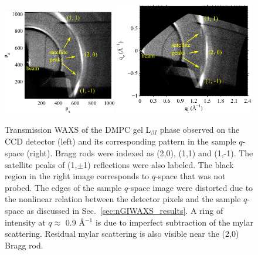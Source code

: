 \begin{figure}[htbp]
  \centering
  \includegraphics[width=0.44\textwidth]{figures/ripple/TWAXS/twaxs_gel_ccd}
  \includegraphics[width=0.54\textwidth]{figures/ripple/TWAXS/twaxs_gel_q}
  \caption[Transmission WAXS of the DMPC gel phase]
  {Transmission WAXS of the DMPC gel L$_{\beta I}$ phase observed on
  the CCD detector (left) and its corresponding pattern in the sample $q$-space
  (right). Bragg rods were indexed as (2,0), (1,1) and (1,-1). The satellite 
  peaks of (1,$\pm$1) reflections were also labeled. The black region in
  the right image corresponds to $q$-space that was not probed. The edges
  of the sample $q$-space image were distorted due to the nonlinear relation
  between the detector pixels and the sample $q$-space as discussed in 
  Sec.~\ref{sec:nGIWAXS_results}. A ring of intensity
  at $q \approx$ 0.9 \AA$^{-1}$ is due to imperfect subtraction of the mylar
  scattering. Residual mylar scattering is also visible near the (2,0) Bragg 
  rod.}
  \label{fig:twaxs_gel}
\end{figure}

